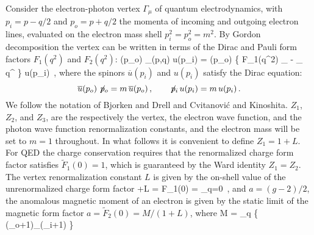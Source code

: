 Consider the electron-photon vertex $\Gamma_{\mu}$ of quantum
electrodynamics, with $p_{i}=p-q/2$ and $p_{o}=p+q/2$ the momenta of
incoming and outgoing electron lines, evaluated on the electron mass
shell $p_{i}^2=p_{o}^2=m^2$.
By Gordon decomposition the vertex can be written in terms of the Dirac
and Pauli form factors $F_1(q^2)$ and $F_2(q^2)$:
\beq
{}(p_{o}) \Gamma_{\mu}(p,q) %
u(p_{i})
    =    %
(p_{o}) \Bigg\{ F_1(q^2) \gamma_{\mu} -
 \; \sigma_{\mu \nu} q^{\nu} \Bigg\} u(p_{i}) \,,
\label{BAGTB17(35-1)}
\eeq
where the spinors  $\overline{u}(p_{i})$ and $u(p_{i})$  satisfy the Dirac
equation:
\[
\overline{u}(p_{o}) \not\!{p}_{o} = m \, \overline{u}(p_{o})
\,, \qquad
\not\!{p}_{i} \, u(p_{i})  =  m \, u(p_{i}) \,.
\]
We follow the notation of Bjorken and Drell
and Cvitanovi{\'c} and Kinoshita.
$Z_1$,
$Z_2$, and %
$Z_3$,
are the respectively the vertex,
the electron wave function, and
the photon wave function
renormalization constants,
and the electron mass will be set to $m = 1$ throughout.
In what follows it is convenient to define $Z_1=1+L$.
For QED the charge conservation requires that the renormalized charge
form factor satisfies $\tilde{F}_1(0) = 1$, which is guaranteed by the
Ward identity
$Z_1=Z_2$.
The vertex renormalization constant $L$ is given by the
on-shell value of the unrenormalized charge form factor
+L = F_1(0)
    = \tr{}_{q=0}
\label{PRD10-74-III(2.3)}
\,,
\eeq
and  $a = (g-2)/2$, the anomalous magnetic moment of an electron is
given by the static limit of the magnetic form factor
$a=\tilde{F}_2(0)=M/(1+L)$, where
\beq
M = \lim_{q}
\tr\left\{
(\not{}_o+1)\Gamma_{\nu}(\not{}_i+1)
\right\}
\label{PRD10-74-III(2.2)}
